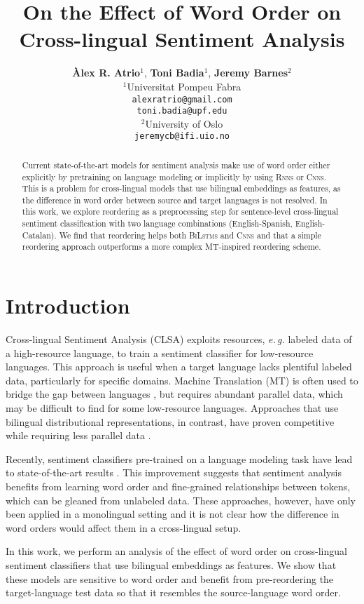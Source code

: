 \documentclass[11pt,a4paper]{article}
\title{On the Effect of Word Order on Cross-lingual Sentiment Analysis}
\author {\textbf{Àlex R. Atrio$^1$}, \textbf{Toni Badia$^{1}$}, \textbf{Jeremy Barnes$^{2}$}\\[5pt]
$^1$Universitat Pompeu Fabra\\
{\tt alexratrio@gmail.com} \\[1pt]
{\tt toni.badia@upf.edu} \\[5pt]
$^2$University of Oslo\\
{\tt jeremycb@ifi.uio.no}
}
\date{}
\newcommand{\bilstms}{\textsc{BiLstms}\xspace}
\newcommand{\cnns}{\textsc{Cnns}\xspace}
\newcommand{\Rnns}{\textsc{Rnns}\xspace}
\newcommand{\eg}{\textit{e.\,g.}\xspace}
\begin{document}
\maketitle
\begin{abstract}
Current state-of-the-art models for sentiment analysis make use of word order
either explicitly by pretraining on language modeling or implicitly
by using \Rnns or \cnns.
This is a problem for cross-lingual models that
use bilingual embeddings as features, as the difference
in word order between source and target languages is
not resolved. In this work, we explore reordering
as a preprocessing step for sentence-level cross-lingual sentiment
classification with two language combinations
(English-Spanish, English-Catalan). We find that reordering helps both \bilstms and \cnns and that a simple reordering
approach outperforms a more complex MT-inspired reordering
scheme.


\end{abstract}


\section{Introduction}


Cross-lingual Sentiment Analysis (CLSA) exploits resources, \eg labeled data of a high-resource language, to train a sentiment classifier for low-resource languages. This approach is useful when a target language lacks plentiful labeled data, particularly for specific domains. Machine Translation (MT) is often used to bridge the gap between languages \cite{Banea2008,Balahur2014d}, but requires abundant parallel data, which may be difficult to find for some low-resource languages. Approaches that use bilingual distributional representations, in contrast, have proven competitive while requiring less parallel data \cite{Chen2016,Barnes2018b}.

Recently, sentiment classifiers pre-trained on a language modeling task have lead to state-of-the-art results \cite{Peters2018,Howard2018,Devlin2018}. This improvement suggests that sentiment analysis benefits from learning word order and fine-grained relationships between tokens, which can be gleaned from unlabeled data. These approaches, however, have only been applied in a monolingual setting and it is not clear how the difference in word orders would affect them in a cross-lingual setup.

In this work, we perform an analysis of the effect of word order on cross-lingual sentiment classifiers that use bilingual embeddings as features. We show that these models are sensitive to word order and benefit from pre-reordering the target-language test data so that it resembles the source-language word order.
\end{document}
